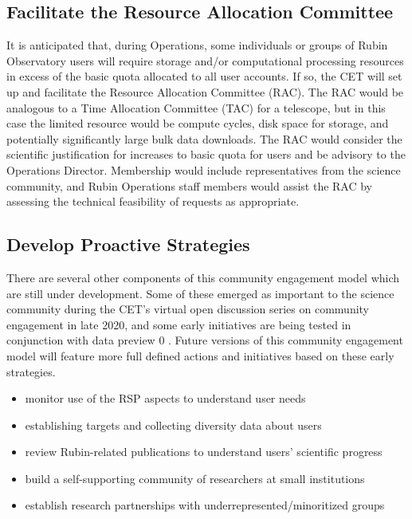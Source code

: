 \documentclass[DM,lsstdraft,toc]{lsstdoc}
\begin{document}
\subsection{Facilitate the Resource Allocation Committee}\label{ssec:mod_rac}

It is anticipated that, during Operations, some individuals or groups of Rubin Observatory users will require storage and/or computational processing resources in excess of the basic quota allocated to all user accounts.
If so, the CET will set up and facilitate the Resource Allocation Committee (RAC).
The RAC would be analogous to a Time Allocation Committee (TAC) for a telescope, but in this case the limited resource would be compute cycles, disk space for storage, and potentially significantly large bulk data downloads.
The RAC would consider the scientific justification for increases to basic quota for users and be advisory to the Operations Director.
Membership would include representatives from the science community, and Rubin Operations staff members would assist the RAC by assessing the technical feasibility of requests as appropriate.


\subsection{Develop Proactive Strategies}

There are several other components of this community engagement model which are still under development.
Some of these emerged as important to the science community during the CET's virtual open discussion series on community engagement in late 2020, and some early initiatives are being tested in conjunction with data preview 0 .
Future versions of this community engagement model will feature more full defined actions and initiatives based on these early strategies.

\begin{itemize}
\item monitor use of the RSP aspects to understand user needs
\item establishing targets and collecting diversity data about users
\item review Rubin-related publications to understand users' scientific progress
\item build a self-supporting community of researchers at small institutions
\item establish research partnerships with underrepresented/minoritized groups
\end{itemize}
\end{document}
